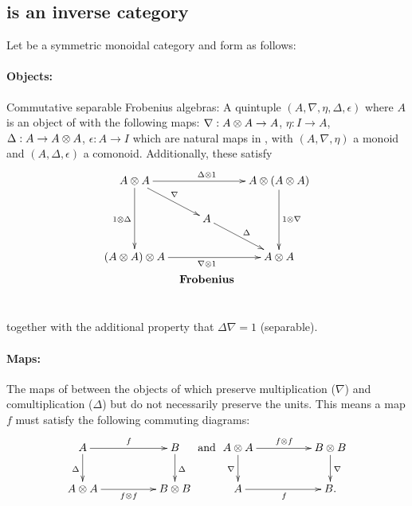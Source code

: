 \subsection{\CFrob is an inverse category}\label{ssec:cfrob_x_is_an_inverse_category}
\begin{example}\label{example:commfrob}
  Let \X be a symmetric monoidal category and form \CFrob as follows: \paragraph{\textbf{Objects:}}
  Commutative separable Frobenius algebras\cite{kock04}: A quintuple $(A,\nabla,\eta,\Delta,\epsilon)$ where
  $A$ is an object of \X with the following maps:
  $\nabla :A\otimes A \to A$, $\eta:I\to A$, $\Delta : A \to A\otimes A$, $\epsilon : A \to I$ which are natural
  maps in \X, with $(A,\nabla,\eta)$ a monoid and $(A,\Delta,\epsilon)$ a comonoid. Additionally, these
  satisfy
  \[
    \xymatrix @C=10pt @R=20pt{
      A \* A \ar[dd]_{1\*\Delta} \ar[dr]^{\nabla}
        \ar[rr]^{\Delta \* 1} & &
        A \* (A \* A) \ar[dd]^{1 \* \nabla}\\
      & A \ar[dr]^{\Delta} & \\
      (A \* A) \* A \ar[rr]_{\nabla \* 1} & &
        A \* A\\
      &*!<0pt,-25pt>{\text{\textbf{Frobenius}}}
    }
  \]
  together with the additional property that $\Delta \nabla = 1$ (separable).

  \paragraph{\textbf{Maps:}} The maps of \X between the objects of \X which preserve multiplication ($\nabla$)
  and comultiplication ($\Delta$) but do not necessarily preserve the units.
  This means a map $f$ must satisfy the following commuting diagrams:
  \[
    \xymatrix@C+25pt{
      A \ar[d]_{\Delta} \ar[r]^{f} & B \ar[d]^{\Delta}\\
      A\*A \ar[r]_{f\*f} & B\* B
    }
    \text{ and }
    \xymatrix@C+25pt{
      A\*A \ar[d]_{\nabla} \ar[r]^{f\*f}& B\*B \ar[d]^{\nabla}\\
      A \ar[r]_{f} & B.
    }
  \]
\end{example}

